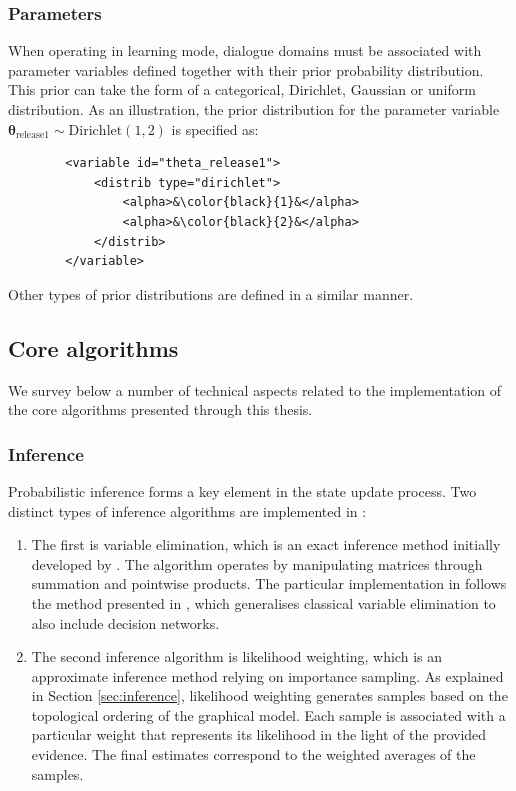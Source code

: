\subsubsection*{Parameters}

When operating in learning mode, dialogue domains must be associated with parameter variables defined together with their prior probability distribution.  This prior can take the form of a categorical, Dirichlet, Gaussian or uniform distribution.  As an illustration, the prior distribution for the parameter variable $\boldsymbol\theta_{\text{release1}} \sim \mathrm{Dirichlet}(1,2)$ is specified as: 

\vspace{3mm}\begin{lstlisting}
        <variable id="theta_release1">
            <distrib type="dirichlet">
                <alpha>&\color{black}{1}&</alpha>
                <alpha>&\color{black}{2}&</alpha>
            </distrib>
        </variable>
\end{lstlisting}\vspace{2mm}

Other types of prior distributions are defined in a similar manner. 

\subsection{Core algorithms}
\label{sec:corealgorithms}

We survey below a number of technical aspects related to the \opendial{} implementation of the core algorithms presented through this thesis.  

\subsubsection*{Inference}

Probabilistic inference forms a key element in the state update process.  Two distinct types of inference algorithms are implemented in \opendial{}: \begin{enumerate}
\item The first is variable elimination, which is an exact inference method initially developed by \cite{ZhangP96}.  The algorithm operates by manipulating matrices through summation and pointwise products. The particular implementation in \opendial{} follows the method presented in \cite[][p. 1101]{Koller+Friedman:09}, which generalises classical variable elimination to also include decision networks.
\item The second inference algorithm is likelihood weighting, which is an approximate inference method relying on importance sampling. As explained in Section \ref{sec:inference}, likelihood weighting generates samples based on the topological ordering of the graphical model. Each sample is associated with a particular weight that represents its likelihood in the light of the provided evidence.  The final estimates correspond to the weighted averages of the samples. 
\end{enumerate}


